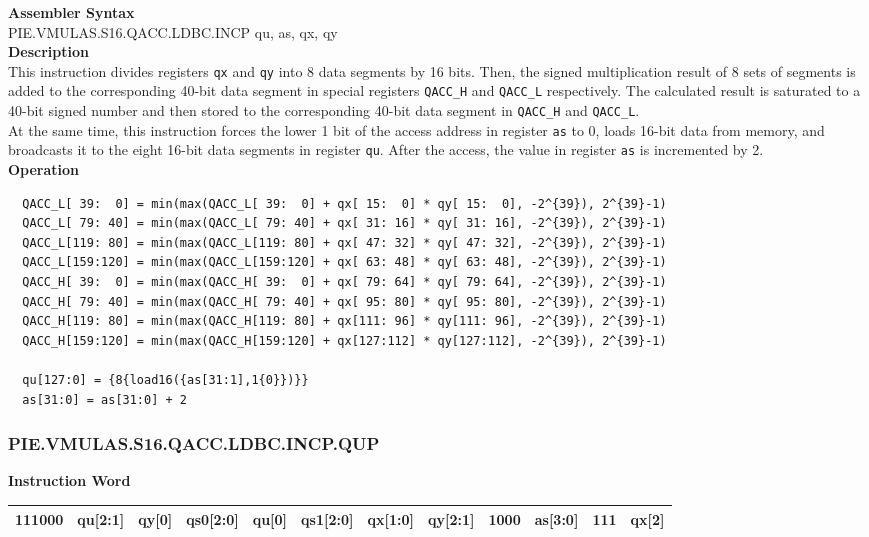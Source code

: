 \textbf{Assembler Syntax} \\
PIE.VMULAS.S16.QACC.LDBC.INCP qu, as, qx, qy \\
\textbf{Description} \\
This instruction divides registers \lstinline{qx} and \lstinline{qy} into 8 data segments by 16 bits. Then, the signed multiplication result of 8 sets of segments is added to the corresponding 40-bit data segment in special registers \lstinline{QACC_H} and \lstinline{QACC_L} respectively. The calculated result is saturated to a 40-bit signed number and then stored to the corresponding 40-bit data segment in \lstinline{QACC_H} and \lstinline{QACC_L}.\\
At the same time, this instruction forces the lower 1 bit of the access address in register \lstinline{as} to 0, loads 16-bit data from memory, and broadcasts it to the eight 16-bit data segments in register \lstinline{qu}. After the access, the value in register \lstinline{as} is incremented by 2.\\
\textbf{Operation}
\begin{lstlisting}
  QACC_L[ 39:  0] = min(max(QACC_L[ 39:  0] + qx[ 15:  0] * qy[ 15:  0], -2^{39}), 2^{39}-1)
  QACC_L[ 79: 40] = min(max(QACC_L[ 79: 40] + qx[ 31: 16] * qy[ 31: 16], -2^{39}), 2^{39}-1)
  QACC_L[119: 80] = min(max(QACC_L[119: 80] + qx[ 47: 32] * qy[ 47: 32], -2^{39}), 2^{39}-1)
  QACC_L[159:120] = min(max(QACC_L[159:120] + qx[ 63: 48] * qy[ 63: 48], -2^{39}), 2^{39}-1)
  QACC_H[ 39:  0] = min(max(QACC_H[ 39:  0] + qx[ 79: 64] * qy[ 79: 64], -2^{39}), 2^{39}-1)
  QACC_H[ 79: 40] = min(max(QACC_H[ 79: 40] + qx[ 95: 80] * qy[ 95: 80], -2^{39}), 2^{39}-1)
  QACC_H[119: 80] = min(max(QACC_H[119: 80] + qx[111: 96] * qy[111: 96], -2^{39}), 2^{39}-1)
  QACC_H[159:120] = min(max(QACC_H[159:120] + qx[127:112] * qy[127:112], -2^{39}), 2^{39}-1)

  qu[127:0] = {8{load16({as[31:1],1{0}})}}
  as[31:0] = as[31:0] + 2
\end{lstlisting}

\newpage
\subsubsection{PIE.VMULAS.S16.QACC.LDBC.INCP.QUP}\label{instruction:PIEVMULASS16QACCLDBCINCPQUP}
\setlength\tabcolsep{6pt}
\textbf{Instruction Word} \\
\begin{tabular}{|c|c|c|c|c|c|c|c|c|c|c|c|}
	\hline
	111000 & qu[2:1] & qy[0] & qs0[2:0] & qu[0] & qs1[2:0] & qx[1:0] & qy[2:1] & 1000 & as[3:0] & 111 & qx[2] \\
	\hline
\end{tabular}

